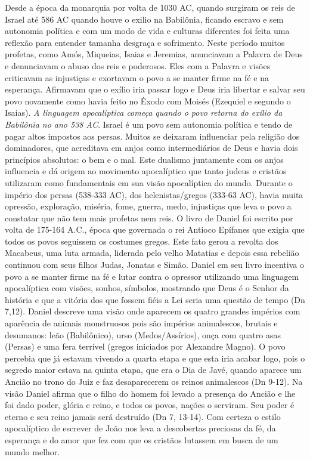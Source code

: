 \documentclass[
]{book}
\begin{document}
Desde a época da monarquia por volta de 1030 AC, quando surgiram os reis de Israel até 586 AC quando houve o exilio na Babilônia, ficando escravo e sem autonomia política e com um modo de vida e culturas diferentes foi feita uma reflexão para entender tamanha desgraça e sofrimento. Neste período muitos profetas, como Amós, Miqueias, Isaias e Jeremias, anunciavam a Palavra de Deus e denunciavam o abuso dos reis e poderosos. Eles com a Palavra e visões criticavam as injustiças e exortavam o povo a se manter firme na fé e na esperança. Afirmavam que o exílio iria passar logo e Deus iria libertar e salvar seu povo novamente como havia feito no Êxodo com Moisés (Ezequiel e segundo o Isaias). \emph{A linguagem apocalíptica começa quando o povo retorna do exílio da Babilônia no ano 538 AC}. Israel é um povo sem autonomia política e tendo de pagar altos impostos aos persas. Muitos se deixaram influenciar pela religião dos dominadores, que acreditava em anjos como intermediários de Deus e havia dois princípios absolutos: o bem e o mal. Este dualismo juntamente com os anjos influencia e dá origem ao movimento apocalíptico que tanto judeus e cristãos utilizaram como fundamentais em sua visão apocalíptica do mundo. Durante o império dos persas (538-333 AC), dos helenistas/gregos (333-63 AC), havia muita opressão, exploração, miséria, fome, guerra, medo, injustiças que leva o povo a constatar que não tem mais profetas nem reis. O livro de Daniel foi escrito por volta de 175-164 A.C., época que governada o rei Antioco Epífanes que exigia que todos os povos seguissem os costumes gregos. Este fato gerou a revolta dos Macabeus, uma luta armada, liderada pelo velho Matatias e depois essa rebelião continuou com seus filhos Judas, Jonatas e Simão. Daniel em seu livro incentiva o povo a se manter firme na fé e lutar contra o opressor utilizando uma linguagem apocalíptica com visões, sonhos, símbolos, mostrando que Deus é o Senhor da história e que a vitória dos que fossem fiéis a Lei seria uma questão de tempo (Dn 7,12). Daniel descreve uma visão onde aparecem os quatro grandes impérios com aparência de animais monstruosos pois são impérios animalescos, brutais e desumanos: leão (Babilônico), urso (Medos/Assírios), onça com quatro asas (Persas) e uma fera terrível (gregos iniciados por Alexandre Magno). O povo percebia que já estavam vivendo a quarta etapa e que esta iria acabar logo, pois o segredo maior estava na quinta etapa, que era o Dia de Javé, quando aparece um Ancião no trono do Juiz e faz desaparecerem os reinos animalescos (Dn 9-12). Na visão Daniel afirma que o filho do homem foi levado a presença do Ancião e lhe foi dado poder, glória e reino, e todos os povos, nações o serviram. Seu poder é eterno e seu reino jamais será destruído (Dn 7, 13-14). Com certeza o estilo apocalíptico de escrever de João nos leva a descobertas preciosas da fé, da esperança e do amor que fez com que os cristãos lutassem em busca de um mundo melhor.
\end{document}
